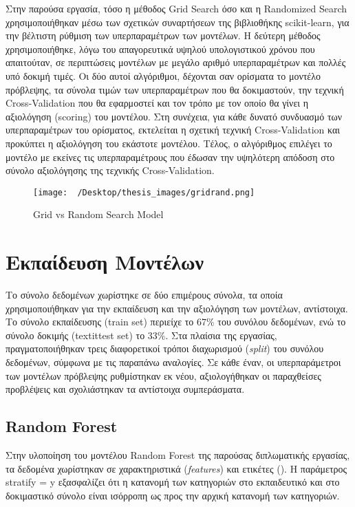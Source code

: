\documentclass[diploma]{softlab-thesis}
\begin{document}
\begin{enumerate}
\begin{enumerate}
Στην παρούσα εργασία, τόσο η μέθοδος Grid Search όσο και η Randomized Search χρησιμοποιήθηκαν μέσω των σχετικών συναρτήσεων της βιβλιοθήκης scikit-learn, για την βέλτιστη ρύθμιση των υπερπαραμέτρων των μοντέλων. Η δεύτερη μέθοδος χρησιμοποιήθηκε, λόγω του απαγορευτικά υψηλού υπολογιστικού χρόνου που απαιτούταν, σε περιπτώσεις μοντέλων με μεγάλο αριθμό υπερπαραμέτρων και πολλές υπό δοκιμή τιμές. Οι δύο αυτοί αλγόριθμοι, δέχονται σαν ορίσματα το μοντέλο πρόβλεψης, τα σύνολα τιμών των υπερπαραμέτρων που θα δοκιμαστούν, την τεχνική Cross-Validation που θα εφαρμοστεί και τον τρόπο με τον οποίο θα γίνει η αξιολόγηση (scoring) του μοντέλου. Στη συνέχεια, για κάθε δυνατό συνδυασμό των υπερπαραμέτρων του ορίσματος, εκτελείται η σχετική τεχνική Cross-Validation και προκύπτει η αξιολόγηση του εκάστοτε μοντέλου. Τέλος, ο αλγόριθμος επιλέγει το μοντέλο με εκείνες τις υπερπαραμέτρους που έδωσαν την υψηλότερη απόδοση στο σύνολο αξιολόγησης της τεχνικής Cross-Validation.

\begin{figure}[H]
    \centering
    \texttt{[image: ~/Desktop/thesis\_images/gridrand.png]} %
    \caption{Grid vs Random Search Model}
    \label{fig:your_image_label}
\end{figure}

\section{Εκπαίδευση Μοντέλων}

Το σύνολο δεδομένων χωρίστηκε σε δύο επιμέρους σύνολα, τα οποία χρησιμοποιήθηκαν για την εκπαίδευση και την αξιολόγηση των μοντέλων, αντίστοιχα. Το σύνολο εκπαίδευσης (train set) περιείχε το 67\% του συνόλου δεδομένων, ενώ το σύνολο δοκιμής (textit{test set}) το 33\%. Στα πλαίσια της εργασίας, πραγματοποιήθηκαν τρεις διαφορετικοί τρόποι διαχωρισμού (\textit{split}) του συνόλου δεδομένων, σύμφωνα με τις παραπάνω αναλογίες. Σε κάθε έναν, οι υπερπαράμετροι των μοντέλων πρόβλεψης ρυθμίστηκαν εκ νέου, αξιολογήθηκαν οι παραχθείσες προβλέψεις και σχολιάστηκαν τα αντίστοιχα συμπεράσματα.

\subsection{Random Forest}

Στην υλοποίηση του μοντέλου Random Forest της παρούσας διπλωματικής εργασίας, τα δεδομένα χωρίστηκαν  σε χαρακτηριστικά (\textit{features}) και ετικέτες (). Η παράμετρος stratify = y εξασφαλίζει ότι η κατανομή των κατηγοριών στο εκπαιδευτικό και στο δοκιμαστικό σύνολο είναι ισόρροπη ως προς την αρχική κατανομή των κατηγοριών. 


\end{enumerate}
\end{enumerate}
\end{document}
